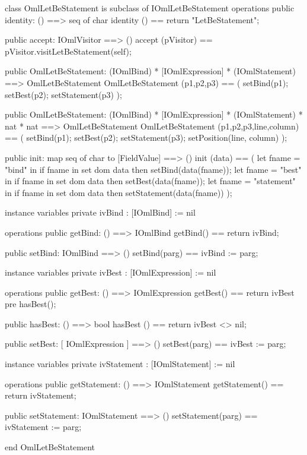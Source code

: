 \begin{vdm_al}
class OmlLetBeStatement is subclass of IOmlLetBeStatement
operations
  public identity: () ==> seq of char
  identity () == return "LetBeStatement";

  public accept: IOmlVisitor ==> ()
  accept (pVisitor) == pVisitor.visitLetBeStatement(self);

  public OmlLetBeStatement:
    (IOmlBind) *
    [IOmlExpression] *
    (IOmlStatement) ==> OmlLetBeStatement
  OmlLetBeStatement (p1,p2,p3) == 
    ( setBind(p1);
      setBest(p2);
      setStatement(p3) );

  public OmlLetBeStatement:
    (IOmlBind) *
    [IOmlExpression] *
    (IOmlStatement) *
    nat *
    nat ==> OmlLetBeStatement
  OmlLetBeStatement (p1,p2,p3,line,column) == 
    ( setBind(p1);
      setBest(p2);
      setStatement(p3);
      setPosition(line, column) );

  public init: map seq of char to [FieldValue] ==> ()
  init (data) ==
    ( let fname = "bind" in
        if fname in set dom data
        then setBind(data(fname));
      let fname = "best" in
        if fname in set dom data
        then setBest(data(fname));
      let fname = "statement" in
        if fname in set dom data
        then setStatement(data(fname)) );

instance variables
  private ivBind : [IOmlBind] := nil

operations
  public getBind: () ==> IOmlBind
  getBind() == return ivBind;

  public setBind: IOmlBind ==> ()
  setBind(parg) == ivBind := parg;

instance variables
  private ivBest : [IOmlExpression] := nil

operations
  public getBest: () ==> IOmlExpression
  getBest() == return ivBest
    pre hasBest();

  public hasBest: () ==> bool
  hasBest () == return ivBest <> nil;

  public setBest: [ IOmlExpression ] ==> ()
  setBest(parg) == ivBest := parg;

instance variables
  private ivStatement : [IOmlStatement] := nil

operations
  public getStatement: () ==> IOmlStatement
  getStatement() == return ivStatement;

  public setStatement: IOmlStatement ==> ()
  setStatement(parg) == ivStatement := parg;

end OmlLetBeStatement
\end{vdm_al}

